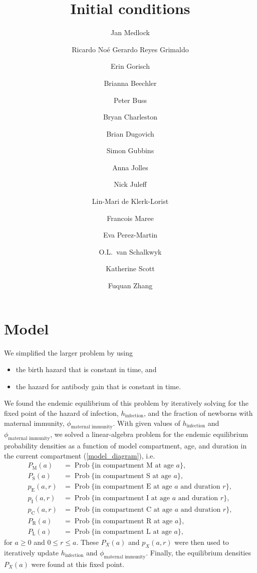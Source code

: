 \documentclass{article}
\title{Initial conditions}
\author{
  Jan Medlock \and Ricardo Noé Gerardo Reyes Grimaldo
  \and Erin Gorisch \and Brianna Beechler \and Peter Buss
  \and Bryan Charleston \and Brian Dugovich \and Simon Gubbins
  \and Anna Jolles \and Nick Juleff \and Lin-Mari de Klerk-Lorist
  \and Francois Maree \and Eva Perez-Martin \and O.L.~van Schalkwyk
  \and Katherine Scott \and Fuquan Zhang
}
\DeclareMathOperator{\Prob}{Prob}
\begin{document}
\maketitle

\section{Model}

We simplified the larger problem by using
\begin{itemize}
\item the birth hazard that is constant in time, and
\item the hazard for antibody gain that is constant in time.
\end{itemize}
We found the endemic equilibrium of this problem by iteratively
solving for the fixed point of the hazard of infection,
$h_{\text{infection}}$, and the fraction of newborns with maternal
immunity, $\phi_{\text{maternal immunity}}$. With given values of
$h_{\text{infection}}$ and $\phi_{\text{maternal immunity}}$, we
solved a linear-algebra problem for the endemic equilibrium
probability densities as a function of model compartment, age, and
duration in the current compartment
(\autoref{model_diagram}), i.e.
\begin{subequations}
  \begin{align}
    P_{\mathrm{M}}(a)
    &= \Prob\{\text{in compartment $\mathrm{M}$ at age $a$}\},\\
    P_{\mathrm{S}}(a)
    &= \Prob\{\text{in compartment $\mathrm{S}$ at age $a$}\},\\
    p_{\mathrm{E}}(a, r)
    &= \Prob\{\text{in compartment $\mathrm{E}$ at age $a$ and
      duration $r$}\},\\
    p_{\mathrm{I}}(a, r)
    &= \Prob\{\text{in compartment $\mathrm{I}$ at age $a$ and
      duration $r$}\},\\
    p_{\mathrm{C}}(a, r)
    &= \Prob\{\text{in compartment $\mathrm{C}$ at age $a$ and
      duration $r$}\},\\
    P_{\mathrm{R}}(a)
    &= \Prob\{\text{in compartment $\mathrm{R}$ at age $a$}\},\\
    P_{\mathrm{L}}(a)
    &= \Prob\{\text{in compartment $\mathrm{L}$ at age $a$}\},
  \end{align}
\end{subequations}
for $a \geq 0$ and $0 \leq r \leq a$.
These $P_X(a)$ and $p_X(a, r)$ were then used to iteratively update
$h_{\text{infection}}$ and $\phi_{\text{maternal immunity}}$. Finally,
the equilibrium densities $P_X(a)$ were found at this fixed point.
\end{document}
